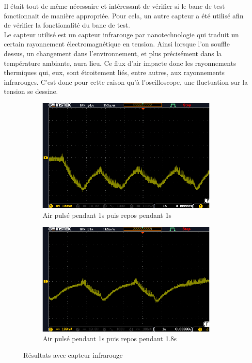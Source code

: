 Il était tout de même nécessaire et intéressant de vérifier si le banc de test fonctionnait de manière appropriée. Pour cela, un autre capteur
a été utilisé afin de vérifier la fonctionalité du banc de test. \\
Le capteur utilisé est un capteur infrarouge par nanotechnologie qui traduit un certain rayonnement électromagnétique en tension. Ainsi lorsque l'on souffle
dessus, un changement dans l'environnement, et plus précisément dans la température ambiante, aura lieu. Ce flux d'air impacte donc
les rayonnements thermiques qui, eux, sont étroitement liés, entre autres, aux rayonnements infrarouges. C'est donc pour cette raison qu'à
l'oscilloscope, une fluctuation sur la tension se dessine.
\begin{figure}[H]
    \centering
    \begin{subfigure}[b]{0.45\textwidth}
        \hspace{-1 cm}
        \includegraphics[scale = 0.45]{assets/figures/CapteurIR_1s_1s.PNG}
        \caption{Air pulsé pendant 1s puis repos pendant 1s}
        \label{fig:1s1s}
    \end{subfigure}
    \begin{subfigure}[b]{0.45\textwidth}
        \centering
        \includegraphics[scale = 0.45]{assets/figures/1_8s_repos.PNG}
        \caption{Air pulsé pendant 1s puis repos pendant 1.8s}
        \label{fig:1_8s}
    \end{subfigure}
    \caption{Résultats avec capteur infrarouge}
    \label{fig:capteurIR}
\end{figure}


